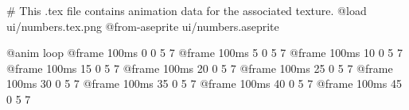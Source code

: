 # This .tex file contains animation data for the associated texture.
@load ui/numbers.tex.png
@from-aseprite ui/numbers.aseprite

@anim loop
	@frame 100ms 0 0 5 7
	@frame 100ms 5 0 5 7
	@frame 100ms 10 0 5 7
	@frame 100ms 15 0 5 7
	@frame 100ms 20 0 5 7
	@frame 100ms 25 0 5 7
	@frame 100ms 30 0 5 7
	@frame 100ms 35 0 5 7
	@frame 100ms 40 0 5 7
	@frame 100ms 45 0 5 7
